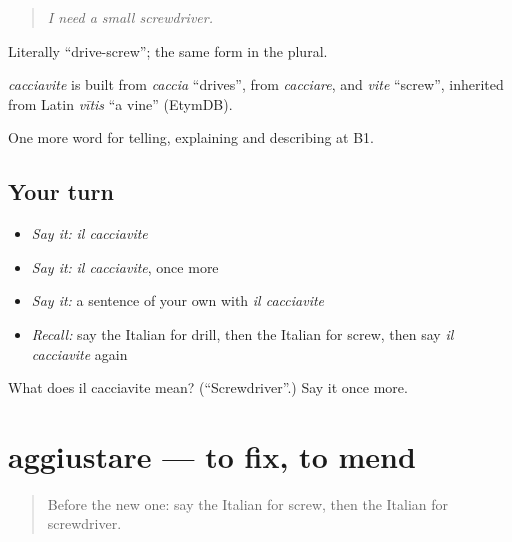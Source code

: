 \begin{quote}
\emph{I need a small screwdriver.}
\end{quote}

Literally \textquotedblleft{}drive-screw\textquotedblright{}; the same form in the plural.

\begin{cousinweb}
\emph{cacciavite} is built from \emph{caccia} \textquotedblleft{}drives\textquotedblright{}, from \emph{cacciare}, and \emph{vite} \textquotedblleft{}screw\textquotedblright{}, inherited from Latin \emph{vītis} \textquotedblleft{}a vine\textquotedblright{} (EtymDB).
\end{cousinweb}

\begin{grammarlens}[title={What you've built}]
One more word for telling, explaining and describing at B1.
\end{grammarlens}

\subsection*{Your turn}
\begin{itemize}
\raggedright
  \item \emph{Say it:} \emph{il cacciavite}
  \item \emph{Say it:} \emph{il cacciavite}, once more
  \item \emph{Say it:} a sentence of your own with \emph{il cacciavite}
  \item \emph{Recall:} say the Italian for drill, then the Italian for screw, then say \emph{il cacciavite} again
\end{itemize}

\begin{tcolorbox}[breakable,colback=teal!4,colframe=teal!35!black,title={Before you move on}]
What does il cacciavite mean? (\textquotedblleft{}Screwdriver\textquotedblright{}.) Say it once more.
\end{tcolorbox}
\section[aggiustare]{aggiustare — to fix, to mend}

\label{lesson:IT-C535-aggiustare}



\begin{quote}
Before the new one: say the Italian for screw, then the Italian for screwdriver.
\end{quote}

